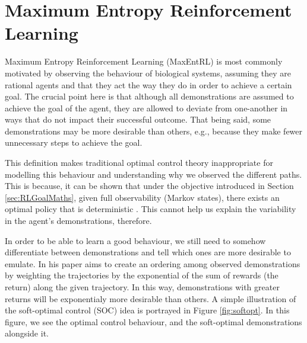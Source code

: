 \documentclass{report}
\numberwithin{equation}{section}
\numberwithin{figure}{section}
\numberwithin{table}{section}
\numberwithin{algorithm}{section}
\begin{document}
\chapter{Maximum Entropy Reinforcement Learning}\label{chap:MaxEntRL}
Maximum Entropy Reinforcement Learning (MaxEntRL) is most commonly 
motivated by observing the behaviour of biological systems, assuming 
they are rational agents and that they act the way they do in order to achieve 
a certain goal. The crucial point here is that although all 
demonstrations are assumed to achieve the goal of the agent, 
they are allowed to deviate from one-another in ways that 
do not impact their successful outcome. That being said, 
some demonstrations may be more desirable than others, e.g., 
because they make fewer unnecessary steps to achieve the goal.

This definition makes 
traditional optimal control theory inappropriate for modelling 
this behaviour and understanding why we observed the different 
paths. This is because, it can be shown that under the objective 
introduced in Section \ref{sec:RLGoalMaths}, given full observability 
(Markov states), there exists an optimal policy that 
is deterministic \citep{Sutton1998}.
This cannot help us explain the variability in the agent's demonstrations,
therefore.

In order to be able to learn a good behaviour, we still 
need to somehow differentiate between demonstrations and tell 
which ones are more desirable to emulate. 
In his paper \cite{Ziebart2008} aims to create an ordering among 
observed demonstrations by weighting the trajectories 
by the exponential of the sum of rewards (the return) along 
the given trajectory. In this way, demonstrations with greater 
returns 
will be exponentialy more desirable than others. A simple illustration 
of the soft-optimal control (SOC) idea is portrayed in Figure \ref{fig:softopt}. 
In this figure, we see the optimal control behaviour, and the 
soft-optimal demonstrations alongside it.
\end{document}
